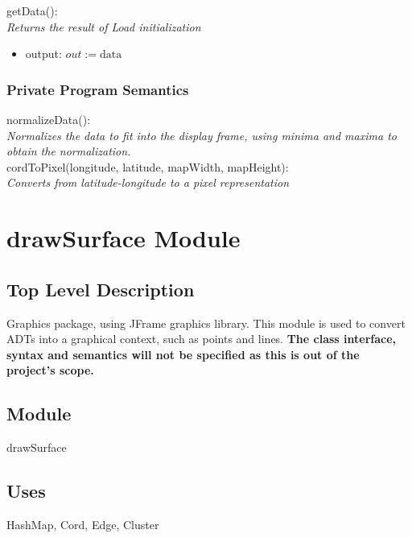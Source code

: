 \documentclass[12pt]{article}
\begin{document}
\noindent
getData():\\
\textit{Returns the result of Load initialization}
\begin{itemize}
\item output: $out := \mbox{data}$
\end{itemize}

\subsubsection* {Private Program Semantics}
\noindent
normalizeData():\\
\textit{Normalizes the data to fit into the display frame, using minima and maxima to obtain
the normalization.}\\

\noindent
cordToPixel(longitude, latitude, mapWidth, mapHeight):\\
\textit{Converts from latitude-longitude to a pixel representation}


\newpage

\section*{drawSurface Module}

\subsection* {Top Level Description}

Graphics package, using JFrame graphics library. This module is used to convert ADTs into
a graphical context, such as points and lines. \textbf{The class interface, syntax and semantics will
not be specified as this is out of the project's scope.}

\subsection*{Module}

drawSurface

\subsection* {Uses}

HashMap, Cord, Edge, Cluster

\newpage
\end{document}
